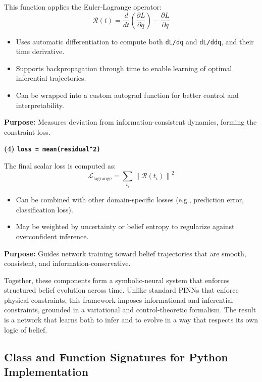 This function applies the Euler-Lagrange operator:
\[
\mathcal{R}(t) = \frac{d}{dt} \left( \frac{\partial L}{\partial \dot{q}} \right) - \frac{\partial L}{\partial q}
\]

\begin{itemize}
    \item Uses automatic differentiation to compute both \texttt{dL/dq} and \texttt{dL/ddq}, and their time derivative.
    \item Supports backpropagation through time to enable learning of optimal inferential trajectories.
    \item Can be wrapped into a custom autograd function for better control and interpretability.
\end{itemize}

\textbf{Purpose:} Measures deviation from information-consistent dynamics, forming the constraint loss.

\vspace{0.5em}
\noindent\textbf{(4) \texttt{loss = mean(residual\^{}2)}}

The final scalar loss is computed as:
\[
\mathcal{L}_{\text{lagrange}} = \sum_{t_i} \left\| \mathcal{R}(t_i) \right\|^2
\]

\begin{itemize}
    \item Can be combined with other domain-specific losses (e.g., prediction error, classification loss).
    \item May be weighted by uncertainty or belief entropy to regularize against overconfident inference.
\end{itemize}

\textbf{Purpose:} Guides network training toward belief trajectories that are smooth, consistent, and information-conservative.

\vspace{0.5em}

Together, these components form a symbolic-neural system that enforces structured belief evolution across time. Unlike standard PINNs that enforce physical constraints, this framework imposes informational and inferential constraints, grounded in a variational and control-theoretic formalism. The result is a network that learns both to infer and to evolve in a way that respects its own logic of belief.


\subsection{Class and Function Signatures for Python Implementation}

